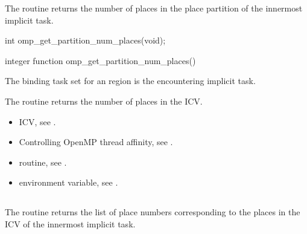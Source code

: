 \summary
The  routine returns the number of places in the place partition
of the innermost implicit task.

\format
\begin{ccppspecific}
\begin{ompcFunction}
int omp_get_partition_num_places(void);
\end{ompcFunction}
\end{ccppspecific}

\begin{fortranspecific}
\begin{ompfFunction}
integer function omp_get_partition_num_places()
\end{ompfFunction}
\end{fortranspecific}

\binding
The binding task set for an   region is the encountering implicit task.

\effect
The  routine returns the number of places in the  ICV.

\crossreferences
\begin{itemize}
\item {} ICV, see
.

\item Controlling OpenMP thread affinity, see
.


\item {} routine, see
.

\item {} environment variable, see
.
\end{itemize}





\subsection{}
\label{subsec:omp_get_partition_place_nums}

\summary
The  routine returns the list of place numbers corresponding to the places in the  ICV of the innermost implicit task.


